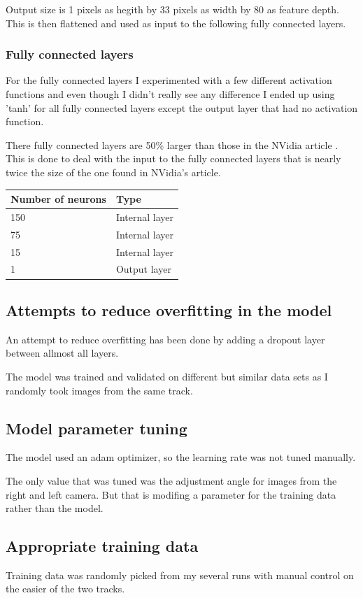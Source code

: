 \documentclass[12pt,a4paper]{article}
\begin{document}
Output size is 1 pixels as hegith by 33 pixels as width by 80 as feature depth. This is then flattened and used as input to the following fully connected layers.

\subsubsection{Fully connected layers}
For the fully connected layers I experimented with a few different activation functions and even though I didn't really see any difference I ended up using 'tanh' for all fully connected layers except the output layer that had no activation function.

There fully connected layers are 50\% larger than those in the NVidia article \cite{DBLP:journals/corr/BojarskiTDFFGJM16}. This is done to deal with the input to the fully connected layers that is nearly twice the size of the one found in NVidia's article.

\begin{tabular}{| l | l |}
\hline
Number of neurons & Type\\
\hline
150 & Internal layer\\
75 & Internal layer \\
15 & Internal layer \\
1 & Output layer \\
\hline
\end{tabular}


\subsection{Attempts to reduce overfitting in the model}
An attempt to reduce overfitting has been done by adding a dropout layer between allmost all layers.

The model was trained and validated on different but similar data sets as I randomly took images from the same track.

\subsection{Model parameter tuning}
The model used an adam optimizer, so the learning rate was not tuned manually. 

The only value that was tuned was the adjustment angle for images from the right and left camera. But that is modifing a parameter for the training data rather than the model.

\subsection{Appropriate training data}
Training data was randomly picked from my several runs with manual control on the easier of the two tracks. 
\end{document}
